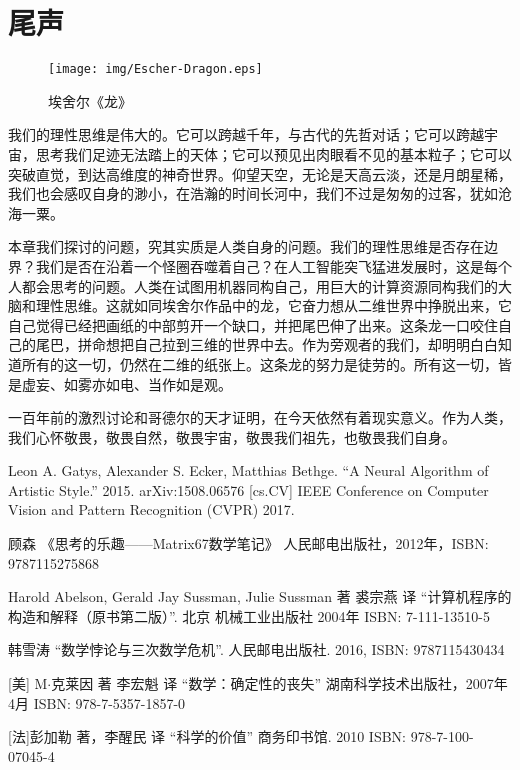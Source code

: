 \documentclass{article}
\begin{document}
\section{尾声}

\begin{wrapfigure}{R}{0.6\textwidth}
 \centering
 \texttt{[image: img/Escher-Dragon.eps]}
 \caption{埃舍尔《龙》}
 \label{fig:Escher-Dragon}
\end{wrapfigure}

我们的理性思维是伟大的。它可以跨越千年，与古代的先哲对话；它可以跨越宇宙，思考我们足迹无法踏上的天体；它可以预见出肉眼看不见的基本粒子；它可以突破直觉，到达高维度的神奇世界。仰望天空，无论是天高云淡，还是月朗星稀，我们也会感叹自身的渺小，在浩瀚的时间长河中，我们不过是匆匆的过客，犹如沧海一粟。

本章我们探讨的问题，究其实质是人类自身的问题。我们的理性思维是否存在边界？我们是否在沿着一个怪圈吞噬着自己？在人工智能突飞猛进发展时，这是每个人都会思考的问题。人类在试图用机器同构自己，用巨大的计算资源同构我们的大脑和理性思维。这就如同埃舍尔作品中的龙，它奋力想从二维世界中挣脱出来，它自己觉得已经把画纸的中部剪开一个缺口，并把尾巴伸了出来。这条龙一口咬住自己的尾巴，拼命想把自己拉到三维的世界中去。作为旁观者的我们，却明明白白知道所有的这一切，仍然在二维的纸张上。这条龙的努力是徒劳的。所有这一切，皆是虚妄、如雾亦如电、当作如是观。

一百年前的激烈讨论和哥德尔的天才证明，在今天依然有着现实意义。作为人类，我们心怀敬畏，敬畏自然，敬畏宇宙，敬畏我们祖先，也敬畏我们自身。

\ifx\wholebook\relax \else
\begin{thebibliography}{99}

Leon A. Gatys, Alexander S. Ecker, Matthias Bethge. ``A Neural Algorithm of Artistic Style.'' 2015. arXiv:1508.06576 [cs.CV] IEEE Conference on Computer Vision and Pattern Recognition (CVPR) 2017.

顾森 《思考的乐趣——Matrix67数学笔记》 人民邮电出版社，2012年，ISBN: 9787115275868

Harold Abelson, Gerald Jay Sussman, Julie Sussman 著 裘宗燕 译 ``计算机程序的构造和解释（原书第二版）''. 北京 机械工业出版社 2004年 ISBN: 7-111-13510-5

韩雪涛 ``数学悖论与三次数学危机''. 人民邮电出版社. 2016, ISBN: 9787115430434

[美] M$\cdot$克莱因 著 李宏魁 译 ``数学：确定性的丧失'' 湖南科学技术出版社，2007年4月 ISBN: 978-7-5357-1857-0

[法]彭加勒 著，李醒民 译 ``科学的价值'' 商务印书馆. 2010 ISBN: 978-7-100-07045-4

\end{thebibliography}

\expandafter\enddocument

\fi
\end{document}
